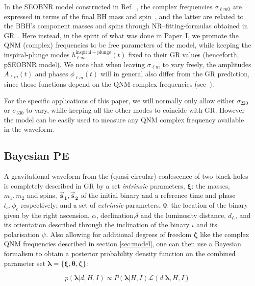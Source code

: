 \documentclass[twocolumn,prd,superscriptaddress,amsfonts,amssymb,amsmath,preprintnumbers]{revtex4-1}
\newcommand{\paperone}{Paper~I\xspace}
\newcommand{\blambda}{\bm{\lambda}}
\newcommand{\btheta}{\bm{\theta}}
\newcommand{\bxi}{\bm{\xi}}
\newcommand{\bzeta}{\bm{\zeta}}
\newcommand{\bs}[1]{\bm{\vec{s}_{#1}}}
\begin{document}
In the SEOBNR model constructed in Ref.~\cite{Cotesta:2018fcv}, the complex frequencies $\sigma_{\ell m 0}$  are expressed in terms of the final BH mass and spin~\cite{Berti:2005ys,Berti:2009kk}, and the latter are related to the BBH's component masses and spins through NR--fitting-formulas obtained in GR~\cite{Taracchini:2013rva,Hofmann:2016yih}. Here instead, in the spirit of what was done in \paperone, we promote the QNM (complex) frequencies to be free parameters of the model, while keeping the inspiral-plunge modes $h_{\ell m}^\mathrm{inspiral-plunge}(t)$ fixed to their GR values (henceforth, pSEOBNR model). We note that when leaving $\sigma_{\ell m}$ to vary freely, the amplitudes $A_{\ell m}(t)$ and phases $\phi_{\ell m} (t)$ will in general also differ from the GR prediction, since those functions depend on the QNM complex frequencies (see~\citep{Cotesta:2018fcv}).

For the specific applications of this paper, we will normally only allow either $\sigma_{220}$ or $\sigma_{330}$ to vary, while keeping all the other modes to coincide with GR. However the model can be easily used to measure any QNM complex frequency available in the waveform.



\subsection{Bayesian PE}\label{sec:method}

A gravitational waveform from the (quasi-circular) coalescence of two black holes is completely described in GR by a set \textit{intrinsic} parameters, $\bxi$: the masses, $m_1, m_2$ and spins, $\bs1, \bs2$ of the initial binary and a reference time and phase $t_c, \phi_c$ respectively; and a set of \textit{extrinsic} parameters, $\btheta$: the location of the binary given by the right ascension, $\alpha$, declination,$\delta$ and the luminosity distance, $d_L$, and its orientation described through the inclination of the binary $\iota$ and its polarisation $\psi$. Also allowing for additional degrees of freedom $\bzeta$ like the complex QNM frequencies described in section \ref{sec:model}, one can then use a Bayesian formalism to obtain a posterior probability density function on the combined parameter set $\blambda = \{\bxi, \btheta, \bzeta\}$:

\begin{equation}
p(\blambda | d, H, I) \propto P(\blambda | H,I) \mathcal{L}(d | \blambda, H, I)
\end{equation}
\end{document}
